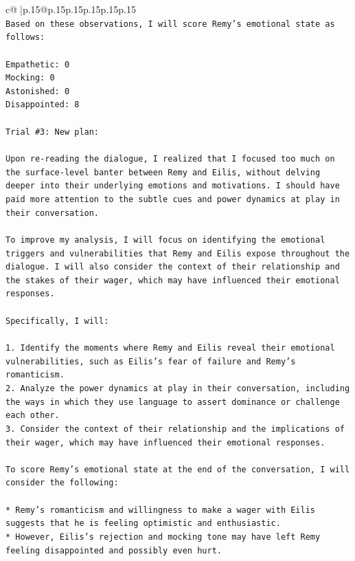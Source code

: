 \documentclass{article}
\begin{document}
{\begin{supertabular}{c@{$\;$}|p{.15\linewidth}@{}p{.15\linewidth}p{.15\linewidth}p{.15\linewidth}p{.15\linewidth}p{.15\linewidth}}
{{{\\ 
\texttt{Based on these observations, I will score Remy's emotional state as follows:} \\
\\ 
\texttt{Empathetic: 0} \\
\texttt{Mocking: 0} \\
\texttt{Astonished: 0} \\
\texttt{Disappointed: 8} \\
\\ 
\texttt{Trial \#3: New plan: } \\
\\ 
\texttt{Upon re{-}reading the dialogue, I realized that I focused too much on the surface{-}level banter between Remy and Eilis, without delving deeper into their underlying emotions and motivations. I should have paid more attention to the subtle cues and power dynamics at play in their conversation.} \\
\\ 
\texttt{To improve my analysis, I will focus on identifying the emotional triggers and vulnerabilities that Remy and Eilis expose throughout the dialogue. I will also consider the context of their relationship and the stakes of their wager, which may have influenced their emotional responses.} \\
\\ 
\texttt{Specifically, I will:} \\
\\ 
\texttt{1. Identify the moments where Remy and Eilis reveal their emotional vulnerabilities, such as Eilis's fear of failure and Remy's romanticism.} \\
\texttt{2. Analyze the power dynamics at play in their conversation, including the ways in which they use language to assert dominance or challenge each other.} \\
\texttt{3. Consider the context of their relationship and the implications of their wager, which may have influenced their emotional responses.} \\
\\ 
\texttt{To score Remy's emotional state at the end of the conversation, I will consider the following:} \\
\\ 
\texttt{* Remy's romanticism and willingness to make a wager with Eilis suggests that he is feeling optimistic and enthusiastic.} \\
\texttt{* However, Eilis's rejection and mocking tone may have left Remy feeling disappointed and possibly even hurt.} \\
}}}
\end{supertabular}}
\end{document}
